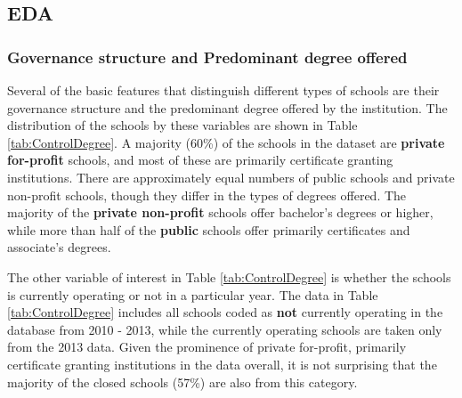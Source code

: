 \documentclass[11pt, letterpaper]{article}
\begin{document}
\subsection{EDA}
\subsubsection{Governance structure and Predominant degree offered}
Several of the basic features that distinguish different types of schools are their governance structure and the predominant degree offered by the institution. The distribution of the schools by these variables are shown in Table \ref{tab:ControlDegree}. A majority (60\%) of the schools in the dataset are \textbf{private for-profit} schools, and most of these are primarily certificate granting institutions. There are approximately equal numbers of public schools and private non-profit schools, though they differ in the types of degrees offered. The majority of the \textbf{private non-profit} schools offer bachelor's degrees or higher, while more than half of the \textbf{public} schools offer primarily certificates and associate's degrees.

The other variable of interest in Table \ref{tab:ControlDegree} is whether the schools is currently operating or not in a particular year. The data in Table \ref{tab:ControlDegree} includes all schools coded as \textbf{not} currently operating in the database from 2010 - 2013, while the currently operating schools are taken only from the 2013 data. Given the prominence of private for-profit, primarily certificate granting institutions in the data overall, it is not surprising that the majority of the closed schools  (57\%) are also from this category.
\end{document}
